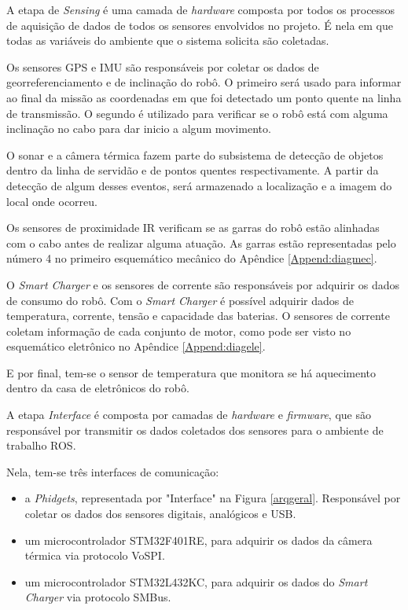  A etapa de \textit{Sensing} é uma camada de \textit{hardware} composta por todos os processos de aquisição de dados de todos os sensores envolvidos no projeto. É nela em que todas as variáveis do ambiente que o sistema solicita são coletadas.
 
Os sensores GPS e IMU são responsáveis por coletar os dados de georreferenciamento e de inclinação do robô. O primeiro será usado para informar ao final da missão as coordenadas em que foi detectado um ponto quente na linha de transmissão. O segundo é utilizado para verificar se o robô está com alguma inclinação no cabo para dar inicio a algum movimento.

O sonar e a câmera térmica fazem parte do subsistema de detecção de objetos dentro da linha de servidão e de pontos quentes respectivamente. A partir da detecção de algum desses eventos, será armazenado a localização e a imagem do local onde ocorreu. 

Os sensores de proximidade IR verificam se as garras do robô estão alinhadas com o cabo antes de realizar alguma atuação. As garras estão representadas pelo número 4 no primeiro esquemático mecânico do Apêndice \ref{Append:diagmec}.

O \textit{Smart Charger} e os sensores de corrente são responsáveis por adquirir os dados de consumo do robô. Com o \textit{Smart Charger} é possível adquirir dados de temperatura, corrente, tensão e capacidade das baterias. O sensores de corrente coletam informação de cada conjunto de motor, como pode ser visto no esquemático eletrônico no Apêndice \ref{Append:diagele}.

E por final, tem-se o sensor de temperatura que monitora se há aquecimento dentro da casa de eletrônicos do robô.
  
A etapa \textit{Interface} é composta por camadas de \textit{hardware} e \textit{firmware}, que são responsável por transmitir os dados coletados dos sensores para o ambiente de trabalho ROS.

Nela, tem-se três interfaces de comunicação: 

\begin{itemize}
	\item a \textit{Phidgets}, representada por "Interface" na Figura \ref{arqgeral}. Responsável por coletar os dados dos sensores digitais, analógicos e USB.
	\item um microcontrolador STM32F401RE, para adquirir os dados da câmera térmica via protocolo VoSPI.
	\item um microcontrolador STM32L432KC, para adquirir os dados do \textit{Smart Charger} via protocolo SMBus.
\end{itemize}
 

